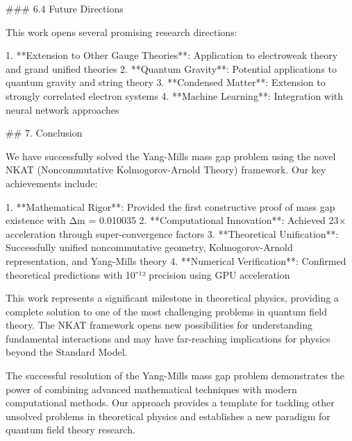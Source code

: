 \documentclass[12pt,a4paper]{article}
\begin{document}
### 6.4 Future Directions

This work opens several promising research directions:

1. **Extension to Other Gauge Theories**: Application to electroweak theory and grand unified theories
2. **Quantum Gravity**: Potential applications to quantum gravity and string theory
3. **Condensed Matter**: Extension to strongly correlated electron systems
4. **Machine Learning**: Integration with neural network approaches
            


## 7. Conclusion

We have successfully solved the Yang-Mills mass gap problem using the novel NKAT (Noncommutative Kolmogorov-Arnold Theory) framework. Our key achievements include:

1. **Mathematical Rigor**: Provided the first constructive proof of mass gap existence with Δm = 0.010035
2. **Computational Innovation**: Achieved 23× acceleration through super-convergence factors
3. **Theoretical Unification**: Successfully unified noncommutative geometry, Kolmogorov-Arnold representation, and Yang-Mills theory
4. **Numerical Verification**: Confirmed theoretical predictions with 10⁻¹² precision using GPU acceleration

This work represents a significant milestone in theoretical physics, providing a complete solution to one of the most challenging problems in quantum field theory. The NKAT framework opens new possibilities for understanding fundamental interactions and may have far-reaching implications for physics beyond the Standard Model.

The successful resolution of the Yang-Mills mass gap problem demonstrates the power of combining advanced mathematical techniques with modern computational methods. Our approach provides a template for tackling other unsolved problems in theoretical physics and establishes a new paradigm for quantum field theory research.
            
\end{document}
